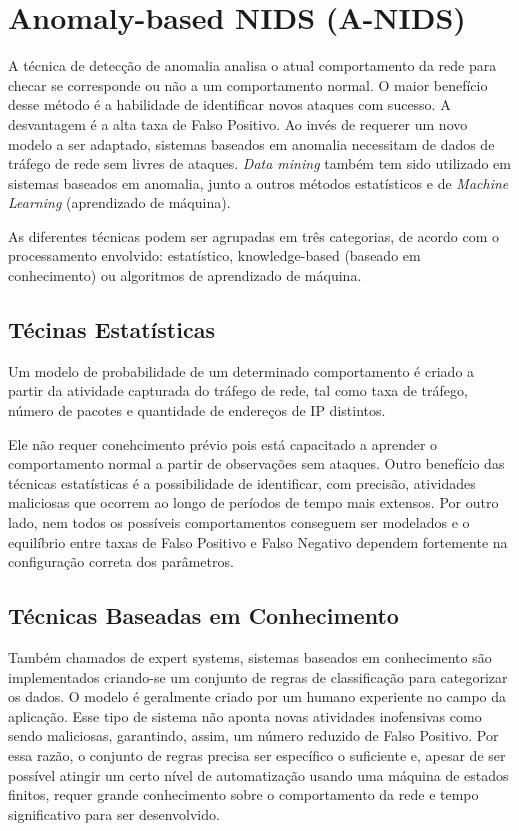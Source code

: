 \chapter{Anomaly-based NIDS (A-NIDS)}
\label{chap:anids}
 A técnica de detecção de anomalia analisa o atual comportamento da rede para checar se corresponde ou não a um
 comportamento normal. O maior benefício desse método é a habilidade de identificar novos ataques com sucesso.
 A desvantagem é a alta taxa de Falso Positivo. Ao invés de requerer um novo modelo a ser adaptado, sistemas baseados
 em anomalia necessitam de dados de tráfego de rede sem livres de ataques. \textit{Data mining} também tem sido
 utilizado em sistemas baseados em anomalia, junto a outros métodos estatísticos e de \textit{Machine Learning}
 (aprendizado de máquina).
 \par As diferentes técnicas podem ser agrupadas em três categorias, de acordo com o processamento envolvido:
 estatístico, knowledge-based (baseado em conhecimento) ou algoritmos de aprendizado de máquina.

\section{Técinas Estatísticas}
Um modelo de probabilidade de um determinado comportamento é criado a partir da atividade capturada do tráfego de rede,
 tal como taxa de tráfego, número de pacotes e quantidade de endereços de IP distintos.
 \par Ele não requer conehcimento prévio pois está capacitado a aprender o comportamento normal a partir de observações
 sem ataques. Outro benefício das técnicas estatísticas é a possibilidade de identificar, com precisão, atividades
 maliciosas que ocorrem ao longo de períodos de tempo mais extensos. Por outro lado, nem todos os possíveis
 comportamentos conseguem ser modelados e o equilíbrio entre taxas de Falso Positivo e Falso Negativo dependem
 fortemente na configuração correta dos parâmetros.

 \section{Técnicas Baseadas em Conhecimento}
 Também chamados de expert systems, sistemas baseados em conhecimento são implementados criando-se um conjunto de
 regras de classificação para categorizar os dados. O modelo é geralmente criado por um humano experiente no campo
 da aplicação. Esse tipo de sistema não aponta novas atividades inofensivas como sendo maliciosas, garantindo, assim,
 um número reduzido de Falso Positivo. Por essa razão, o conjunto de regras precisa ser específico o suficiente e,
 apesar de ser possível atingir um certo nível de automatização usando uma máquina de estados finitos, requer
 grande conhecimento sobre o comportamento da rede e tempo significativo para ser desenvolvido.


